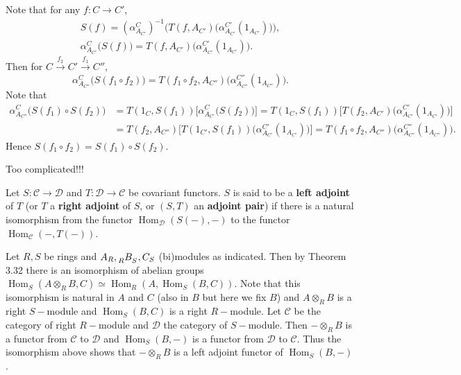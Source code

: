 \documentclass{article}
\DeclareMathOperator{\Hom}{Hom}
\begin{document}
\begin{remark}
    Note that for any $f:C\to C'$, 
    $$\begin{aligned}
    S(f) = (\alpha^C_{A_{C'}})^{-1} \Big( T(f, A_{C'}) \big( \alpha^{C'}_{A_{C'}}(1_{A_{C'}}) \big) \Big), \\
    \alpha^C_{A_{C'}}\big(S(f)\big) = T(f, A_{C'}) \big( \alpha^{C'}_{A_{C'}}(1_{A_{C'}}) \big).
    \end{aligned}$$
    Then for $C \xrightarrow{f_2} C' \xrightarrow{f_1} C''$,
    $$\alpha^C_{A_{C''}}\big(S(f_1 \circ f_2)\big) = T(f_1 \circ f_2, A_{C''}) \big( \alpha^{C''}_{A_{C''}}(1_{A_{C''}}) \big) .$$
    Note that
    $$\begin{aligned}
    \alpha^C_{A_{C''}}\big(S(f_1) \circ S(f_2)\big) 
    &= T(1_C, S(f_1)) \Big[ \alpha^C_{A_{C'}}\big(S(f_2)\big) \Big]
    = T(1_C, S(f_1)) \Big[ T(f_2, A_{C'}) \big( \alpha^{C'}_{A_{C'}}(1_{A_{C'}}) \big) \Big] \\
    &= T(f_2, A_{C''}) \Big[ T(1_{C'}, S(f_1)) \big( \alpha^{C'}_{A_{C'}}(1_{A_{C'}}) \big) \Big]
    = T(f_1 \circ f_2, A_{C''}) \big( \alpha^{C''}_{A_{C''}}(1_{A_{C''}}) \big).
    \end{aligned}$$
    Hence $S(f_1 \circ f_2) = S(f_1) \circ S(f_2)$.

    Too complicated!!!
\end{remark}

\begin{definition}
    Let $S : \mathscr{C} \to \mathscr{D}$ and $T : \mathscr{D} \to \mathscr{C}$ be covariant functors. $S$ is said to be a \textbf{left adjoint} of $T$ (or $T$ a \textbf{right adjoint} of $S$, or $(S,T)$ an \textbf{adjoint pair}) if there is a natural isomorphism from the functor $\Hom_{\mathscr{D}}(S(-), -)$ to the functor $\Hom_{\mathscr{C}}(-, T(-))$.
\end{definition}

\begin{example}
    Let $R,S$ be rings and $A_R,\tensor[_R]{B}{_S},C_S$ (bi)modules as indicated. Then by Theorem 3.32 there is an isomorphism of abelian groups $        \Hom_{S}(A\otimes_R B,C) \simeq \Hom_{R}(A,\Hom_{S}(B,C)).$ 
    Note that this isomorphism is natural in $A$ and $C$ (also in $B$ but here we fix $B$) and $A\otimes_R B$ is a right $S-$module and $\Hom_{S}(B,C)$ is a right $R-$module. Let $\mathscr{C}$ be the category of right $R-$module and $\mathscr{D}$ the category of $S-$module. Then $- \otimes_R B$ is a functor from $\mathscr{C}$ to $\mathscr{D}$ and $\Hom_{S}(B,-)$ is a functor from $\mathscr{D}$ to $\mathscr{C}$. Thus the isomorphism above shows that $- \otimes_R B$ is a left adjoint functor of $\Hom_{S}(B,-)$.
\end{example}
\end{document}
